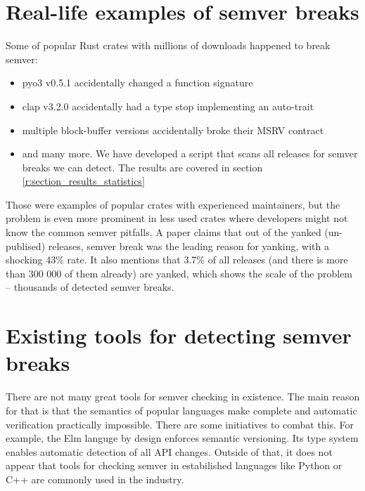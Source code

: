 \documentclass[licencjacka,en]{pracamgr}
\begin{document}
\section{Real-life examples of semver breaks} \label{r:section_real_life_semver_breaks}

Some of popular Rust crates with millions of downloads happened to break semver:
\begin{itemize}
    \item {\ttfamily pyo3 v0.5.1} accidentally changed a function signature \cite{pyo3-issue}
    \item {\ttfamily clap v3.2.0} accidentally had a type stop implementing an auto-trait
		\cite{clap-issue}
    \item multiple {\ttfamily block-buffer} versions accidentally broke their MSRV contract
		\cite{block-buffer-issue}
    \item and many more. We have developed a script that scans all releases for semver breaks we
		can detect. The results are covered in section \ref{r:section_results_statistics}
\end{itemize}

Those were examples of popular crates with experienced maintainers, but the problem is even more
prominent in less used crates where developers might not know the common semver pitfalls. A paper
\cite{paper} claims that out of the yanked (un-publised) releases, semver break was the leading
reason for yanking, with a shocking 43\% rate. It also mentions that 3.7\% of all releases
(and there is more than 300 000 of them already) are yanked, which shows the scale of the problem
-- thousands of detected semver breaks.

\section{Existing tools for detecting semver breaks}\label{r:section_existing_semver_tools}

There are not many great tools for semver checking in existence. The main reason for that is that
the semantics of popular languages make complete and automatic verification practically impossible.
There are some initiatives to combat this. For example, the Elm languge \cite{elm-lang} by design
enforces semantic versioning. Its type system enables automatic detection of all API changes.
Outside of that, it does not appear that tools for checking semver in estabilished languages like
Python or C++ are commonly used in the industry.
\end{document}
